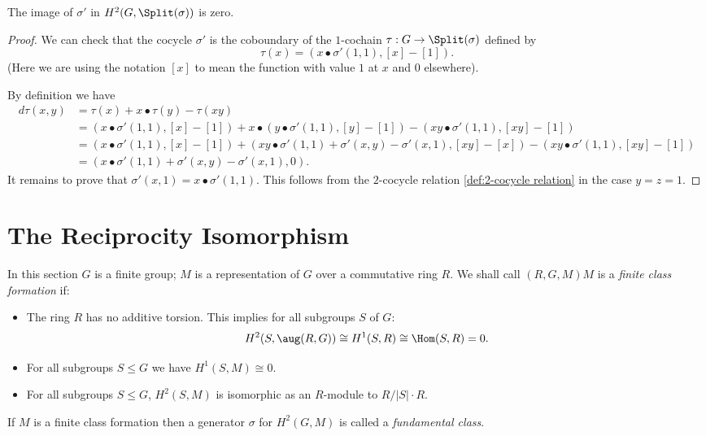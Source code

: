 \begin{lemma} \label{lem:splits in splitting module}
	The image of $\sigma'$ in $H^2(G,\Split(\sigma))$ is zero.
\end{lemma}

\begin{proof}
	We can check that the cocycle $\sigma'$ is the coboundary of
	the $1$-cochain $\tau : G \to \Split(\sigma)$ defined by
	\[
		\tau (x) = (x \bullet σ'(1,1), [x]-[1]).
	\]
	(Here we are using the notation $[x]$
	to mean the function with value $1$ at $x$ and $0$ elsewhere).

	By definition we have
	\begin{align*}
		d\tau (x,y)
		&= \tau(x) + x \bullet \tau(y) - \tau(xy) \\
		&= (x \bullet σ'(1,1), [x]-[1])
		+ x \bullet (y \bullet σ'(1,1), [y]-[1])
		-(xy \bullet σ'(1,1), [xy]-[1])\\
		&=
		(x \bullet σ'(1,1), [x]-[1])
		+ (xy \bullet σ'(1,1) + \sigma'(x,y) -\sigma'(x,1), [xy]-[x])
		- (xy \bullet σ'(1,1), [xy]-[1])\\
		&=
		(x \bullet \sigma'(1,1) + \sigma'(x,y) -\sigma'(x,1) , 0).
	\end{align*}
	It remains to prove that $\sigma'(x,1) = x \bullet \sigma'(1,1)$.
	This follows from the $2$-cocycle relation \ref{def:2-cocycle relation}	in the case $y=z=1$.
\end{proof}





\section{The Reciprocity Isomorphism}

\begin{definition} \label{def:fundamental class}
	In this section $G$ is a finite group; $M$ is a representation of $G$ over a commutative ring $R$.
	We shall call $(R,G,M)M$ is a \emph{finite class formation} if:
	\begin{itemize}
		\item
		The ring $R$ has no additive torsion. This implies for all subgroups $S$ of $G$:
		\[
			H^2(S,\aug(R,G)) \cong H^1(S,R) \cong \Hom(S,R) = 0.
		\]
		\item
		For all subgroups $S \le G$ we have $H^1(S,M) \cong 0$.
		\item
		For all subgroups $S \le G$, $H^2(S,M)$ is isomorphic as an $R$-module to $R / |S| \cdot R$.
	\end{itemize}
	If $M$ is a finite class formation then a generator $\sigma$ for $H^2(G,M)$ is called
	a \emph{fundamental class}.
\end{definition}

